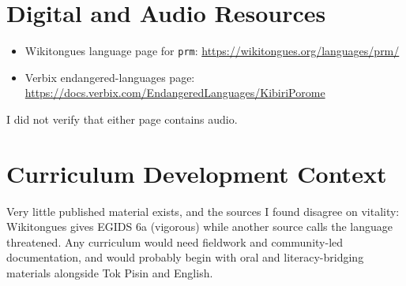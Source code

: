 \documentclass[12pt]{article}
\begin{document}
\section{Digital and Audio Resources}
\begin{itemize}
\item Wikitongues language page for \texttt{prm}: \url{https://wikitongues.org/languages/prm/}
\item Verbix endangered-languages page: \url{https://docs.verbix.com/EndangeredLanguages/KibiriPorome}
\end{itemize}
I did not verify that either page contains audio.

\section{Curriculum Development Context}
Very little published material exists, and the sources I found disagree on vitality: Wikitongues gives EGIDS 6a (vigorous) while another source calls the language threatened. Any curriculum would need fieldwork and community-led documentation, and would probably begin with oral and literacy-bridging materials alongside Tok Pisin and English.
\end{document}
